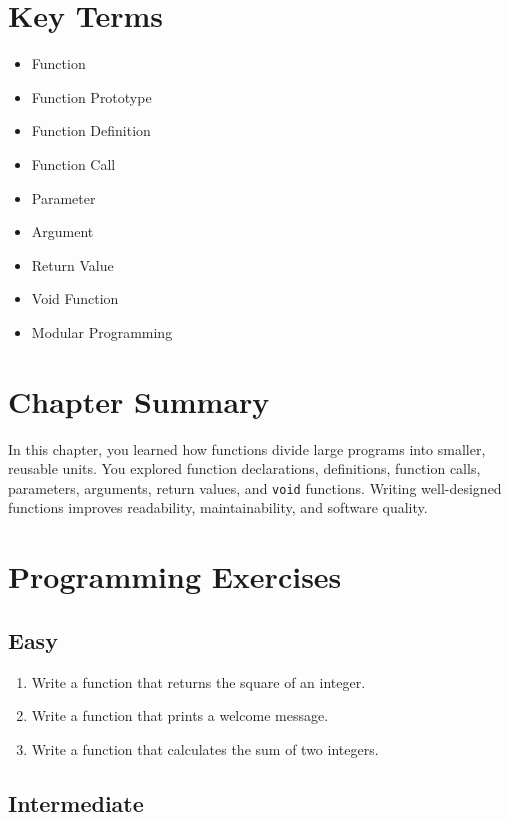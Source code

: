 \documentclass[12pt,openany]{book}
\begin{document}
\section{Key Terms}

\begin{itemize}
    \item Function
    \item Function Prototype
    \item Function Definition
    \item Function Call
    \item Parameter
    \item Argument
    \item Return Value
    \item Void Function
    \item Modular Programming
\end{itemize}

\section{Chapter Summary}

In this chapter, you learned how functions divide large programs into smaller, reusable units. You explored function declarations, definitions, function calls, parameters, arguments, return values, and \texttt{void} functions. Writing well-designed functions improves readability, maintainability, and software quality.

\section{Programming Exercises}

\subsection*{Easy}

\begin{enumerate}
    \item Write a function that returns the square of an integer.
    \item Write a function that prints a welcome message.
    \item Write a function that calculates the sum of two integers.
\end{enumerate}

\subsection*{Intermediate}
\end{document}
